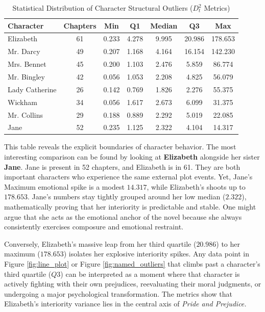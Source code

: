 \begin{table}[H]
\centering
\caption{Statistical Distribution of Character Structural Outliers ($D^2_t$ Metrics)}
\label{tab:summary_stats}
\vspace{2mm}
\begin{tabular}{lcccccc}
\toprule
\textbf{Character} & \textbf{Chapters} & \textbf{Min} & \textbf{Q1} & \textbf{Median} & \textbf{Q3} & \textbf{Max} \\
\midrule
Elizabeth      & 61 & 0.233 & 4.278 & 9.995 & 20.986 & 178.653 \\
Mr. Darcy      & 49 & 0.207 & 1.168 & 4.164 & 16.154 & 142.230 \\
Mrs. Bennet    & 45 & 0.200 & 1.103 & 2.476 &  5.859 &  86.774 \\
Mr. Bingley    & 42 & 0.056 & 1.053 & 2.208 &  4.825 &  56.079 \\
Lady Catherine & 26 & 0.142 & 0.769 & 1.826 &  2.276 &  55.375 \\
Wickham        & 34 & 0.056 & 1.617 & 2.673 &  6.099 &  31.375 \\
Mr. Collins    & 29 & 0.188 & 0.889 & 2.292 &  5.019 &  22.085 \\
Jane           & 52 & 0.235 & 1.125 & 2.322 &  4.104 &  14.317 \\
\bottomrule
\end{tabular}
\end{table}

This table reveals the explicit boundaries of character behavior. The most interesting comparison can be found by looking at \textbf{Elizabeth} alongside her sister \textbf{Jane}. Jane is present in 52 chapters, and Elizabeth is in 61. They are both important characters who experience the same external plot events. Yet, Jane's Maximum emotional spike is a modest $14.317$, while Elizabeth's shoots up to $178.653$. Jane's numbers stay tightly grouped around her low median ($2.322$), mathematically proving that her interiority is predictable and stable. One might argue that she acts as the emotional anchor of the novel because she always consistently exercises composure and emotional restraint.

Conversely, Elizabeth's massive leap from her third quartile ($20.986$) to her maximum ($178.653$) isolates her explosive interiority spikes. Any data point in Figure \ref{fig:line_plot} or Figure \ref{fig:named_outliers} that climbs past a character's third quartile ($Q3$) can be interpreted as a moment where that character is actively fighting with their own prejudices, reevaluating their moral judgments, or undergoing a major psychological transformation. The metrics show that Elizabeth's interiority variance lies in the central axis of \textit{Pride and Prejudice.}

